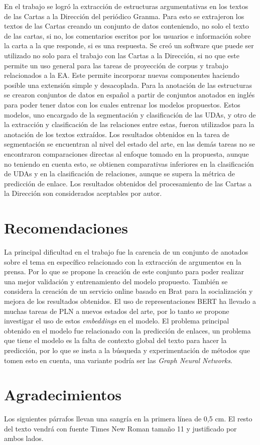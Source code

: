 \documentclass[a4paper,11pt,twocolumn,twoside]{article}
\begin{document}
En el trabajo se logró la extracción de estructuras argumentativas en los textos de las 
Cartas a la Dirección del periódico Granma. Para esto se 
extrajeron los textos de las Cartas creando un conjunto de datos
conteniendo, no solo el texto de las cartas, si no, los comentarios 
escritos por los usuarios e información sobre la carta a la que responde, si es una respuesta.
Se creó un software que puede ser utilizado no solo para el trabajo con las Cartas a la Dirección, si no
que este permite un uso general para las tareas de proyección de corpus y trabajo relacionados a la EA.
Este permite incorporar nuevas componentes haciendo posible una extensión simple y desacoplada. 
Para la anotación de las estructuras se crearon conjuntos de datos en español a partir de conjuntos 
anotados en inglés para poder 
tener datos con los cuales entrenar los modelos propuestos. Estos modelos, uno encargado 
de la segmentación y clasificación de las UDAs, y otro de la extracción y clasificación de las 
relaciones entre estas, fueron utilizados para la anotación de los textos extraídos.
Los resultados obtenidos en la tarea de segmentación se encuentran al nivel del estado del arte,
en las demás tareas no se encontraron comparaciones directas al enfoque tomado en la propuesta,
aunque no teniendo en cuenta esto, se obtienen comparativas inferiores en la clasificación
de UDAs y en la clasificación de relaciones, aunque se supera la métrica de predicción de enlace. 
Los resultados obtenidos del procesamiento de las Cartas a la Dirección son considerados 
aceptables por autor. 

\section{Recomendaciones}

La principal dificultad en el trabajo fue la carencia de un conjunto de anotados
sobre el tema en específico relacionado con la extracción de argumentos en la prensa.
Por lo que se propone la creación de este conjunto para poder realizar una mejor 
validación y entrenamiento del modelo propuesto. También se considera la creación de un servicio 
online basado en Brat para la socialización y mejora de los resultados obtenidos.
El uso de representaciones BERT ha llevado a muchas tareas de PLN a nuevos estados 
del arte, por lo tanto se propone investigar el uso de estos \textit{embeddings} en 
el modelo. El problema principal obtenido en el modelo fue relacionado con la 
predicción de enlaces, un problema que tiene el modelo es la falta de contexto global
del texto para hacer la predicción, por lo que se insta a la búsqueda y experimentación
de métodos que tomen esto en cuenta, una variante podría ser las \textit{Graph Neural Networks}.

\section*{Agradecimientos}

Los siguientes párrafos llevan una sangría en la primera línea de
0,5 cm. El resto del texto vendrá con fuente Times New Roman
tamaño 11 y justificado por ambos lados.




\end{document}

